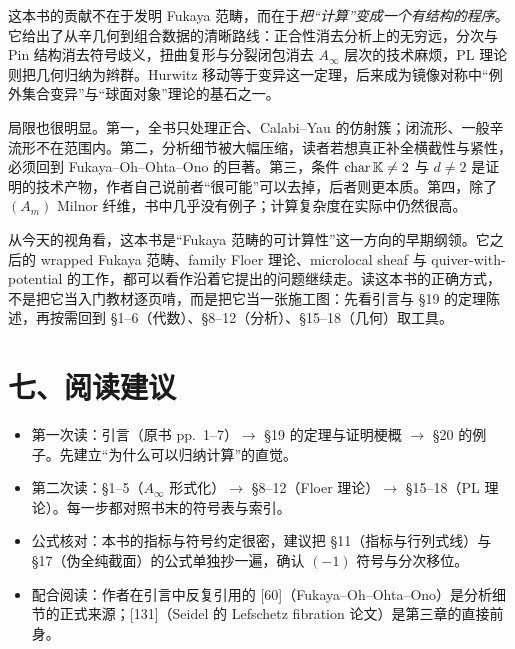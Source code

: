 这本书的贡献不在于发明 Fukaya 范畴，而在于\emph{把“计算”变成一个有结构的程序}。它给出了从辛几何到组合数据的清晰路线：正合性消去分析上的无穷远，分次与 Pin 结构消去符号歧义，扭曲复形与分裂闭包消去 $A_\infty$ 层次的技术麻烦，PL 理论则把几何归纳为辫群。Hurwitz 移动等于变异这一定理，后来成为镜像对称中“例外集合变异”与“球面对象”理论的基石之一。

局限也很明显。第一，全书只处理正合、Calabi--Yau 的仿射簇；闭流形、一般辛流形不在范围内。第二，分析细节被大幅压缩，读者若想真正补全横截性与紧性，必须回到 Fukaya--Oh--Ohta--Ono 的巨著。第三，条件 $\operatorname{char}\mathbb K\ne2$ 与 $d\ne2$ 是证明的技术产物，作者自己说前者“很可能”可以去掉，后者则更本质。第四，除了 $(A_m)$ Milnor 纤维，书中几乎没有例子；计算复杂度在实际中仍然很高。

从今天的视角看，这本书是“Fukaya 范畴的可计算性”这一方向的早期纲领。它之后的 wrapped Fukaya 范畴、family Floer 理论、microlocal sheaf 与 quiver-with-potential 的工作，都可以看作沿着它提出的问题继续走。读这本书的正确方式，不是把它当入门教材逐页啃，而是把它当一张施工图：先看引言与 §19 的定理陈述，再按需回到 §1--6（代数）、§8--12（分析）、§15--18（几何）取工具。

\section*{七、阅读建议}

\begin{itemize}
\item 第一次读：引言（原书 pp.~1--7）$\to$ §19 的定理与证明梗概 $\to$ §20 的例子。先建立“为什么可以归纳计算”的直觉。
\item 第二次读：§1--5（$A_\infty$ 形式化）$\to$ §8--12（Floer 理论）$\to$ §15--18（PL 理论）。每一步都对照书末的符号表与索引。
\item 公式核对：本书的指标与符号约定很密，建议把 §11（指标与行列式线）与 §17（伪全纯截面）的公式单独抄一遍，确认 $(-1)$ 符号与分次移位。
\item 配合阅读：作者在引言中反复引用的 [60]（Fukaya--Oh--Ohta--Ono）是分析细节的正式来源；[131]（Seidel 的 Lefschetz fibration 论文）是第三章的直接前身。
\end{itemize}
